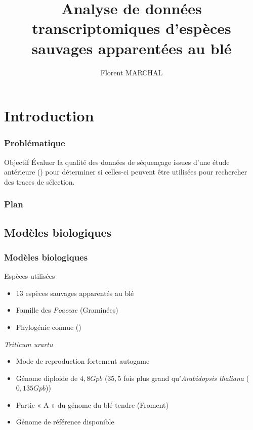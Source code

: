


\title{Analyse de données
transcriptomiques d’espèces sauvages
apparentées au blé}
\author{Florent MARCHAL}



\section{Introduction}

\begin{frame}
    \frametitle{Problématique}
    
    \begin{alertblock}{Objectif}
       Évaluer la qualité des données de séquençage issues d’une étude antérieure (\cite{burgarella_mating_2024}) pour déterminer si celles-ci peuvent être utilisées pour rechercher des traces de sélection.
    \end{alertblock}
    
\end{frame}


\begin{frame}
    \frametitle{Plan}
    
    \tableofcontents[sectionstyle=show, subsectionstyle=show/show/hide]
    
\end{frame}


\subsection{Modèles biologiques}
\begin{frame}

    \frametitle{Modèles biologiques}
    \begin{block}{Espèces utilisées}
        \begin{itemize}
            \item 13 espèces sauvages apparentés au blé 
            \item Famille des \textit{Poaceae} (Graminées)
            \item Phylogénie connue (\cite{burgarella_mating_2024})
        \end{itemize}
    \end{block}
    \pause
    \vspace{0.25cm}
    \begin{block}{\textit{Triticum urartu}}
        \begin{itemize}


            \item Mode de reproduction fortement autogame 
            \item Génome diploide de $4,8Gpb$  ($35,5$ fois plus
grand qu’\textit{Arabidopsis thaliana} ($0, 135Gpb$))
            \item Partie « A » du génome du blé tendre (Froment)
            \item Génome de référence disponible
        \end{itemize}
    \end{block}
\end{frame}


